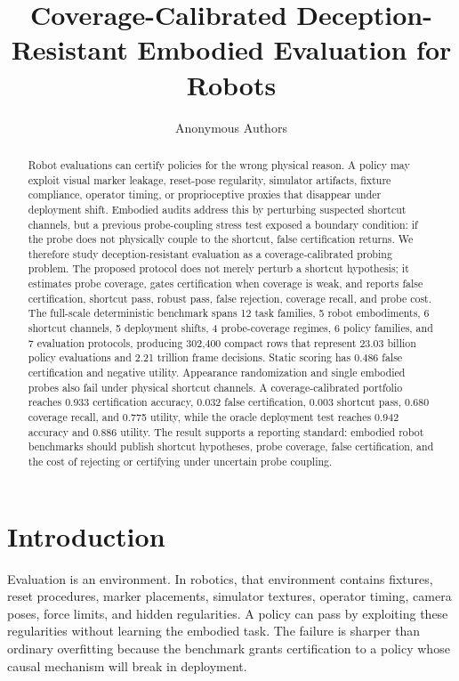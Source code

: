 \documentclass{article}
\title{Coverage-Calibrated Deception-Resistant Embodied Evaluation for Robots}
\author{Anonymous Authors}
\begin{document}
\maketitle

\begin{abstract}
Robot evaluations can certify policies for the wrong physical reason. A policy may exploit visual marker leakage, reset-pose regularity, simulator artifacts, fixture compliance, operator timing, or proprioceptive proxies that disappear under deployment shift. Embodied audits address this by perturbing suspected shortcut channels, but a previous probe-coupling stress test exposed a boundary condition: if the probe does not physically couple to the shortcut, false certification returns. We therefore study deception-resistant evaluation as a coverage-calibrated probing problem. The proposed protocol does not merely perturb a shortcut hypothesis; it estimates probe coverage, gates certification when coverage is weak, and reports false certification, shortcut pass, robust pass, false rejection, coverage recall, and probe cost. The full-scale deterministic benchmark spans 12 task families, 5 robot embodiments, 6 shortcut channels, 5 deployment shifts, 4 probe-coverage regimes, 6 policy families, and 7 evaluation protocols, producing 302,400 compact rows that represent 23.03 billion policy evaluations and 2.21 trillion frame decisions. Static scoring has 0.486 false certification and negative utility. Appearance randomization and single embodied probes also fail under physical shortcut channels. A coverage-calibrated portfolio reaches 0.933 certification accuracy, 0.032 false certification, 0.003 shortcut pass, 0.680 coverage recall, and 0.775 utility, while the oracle deployment test reaches 0.942 accuracy and 0.886 utility. The result supports a reporting standard: embodied robot benchmarks should publish shortcut hypotheses, probe coverage, false certification, and the cost of rejecting or certifying under uncertain probe coupling.
\end{abstract}

\section{Introduction}

Evaluation is an environment. In robotics, that environment contains fixtures, reset procedures, marker placements, simulator textures, operator timing, camera poses, force limits, and hidden regularities. A policy can pass by exploiting these regularities without learning the embodied task. The failure is sharper than ordinary overfitting because the benchmark grants certification to a policy whose causal mechanism will break in deployment.
\end{document}
